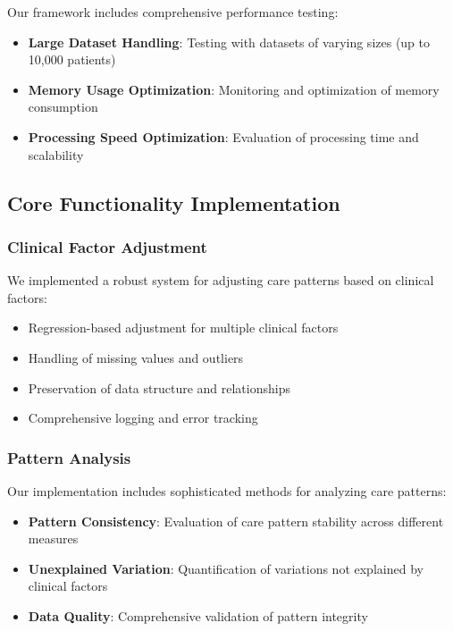 \documentclass[12pt]{article}
\begin{document}
Our framework includes comprehensive performance testing:
\begin{itemize}
    \item \textbf{Large Dataset Handling}: Testing with datasets of varying sizes (up to 10,000 patients)
    \item \textbf{Memory Usage Optimization}: Monitoring and optimization of memory consumption
    \item \textbf{Processing Speed Optimization}: Evaluation of processing time and scalability
\end{itemize}

\subsection{Core Functionality Implementation}

\subsubsection{Clinical Factor Adjustment}

We implemented a robust system for adjusting care patterns based on clinical factors:
\begin{itemize}
    \item Regression-based adjustment for multiple clinical factors
    \item Handling of missing values and outliers
    \item Preservation of data structure and relationships
    \item Comprehensive logging and error tracking
\end{itemize}

\subsubsection{Pattern Analysis}

Our implementation includes sophisticated methods for analyzing care patterns:
\begin{itemize}
    \item \textbf{Pattern Consistency}: Evaluation of care pattern stability across different measures
    \item \textbf{Unexplained Variation}: Quantification of variations not explained by clinical factors
    \item \textbf{Data Quality}: Comprehensive validation of pattern integrity
\end{itemize}
\end{document}
